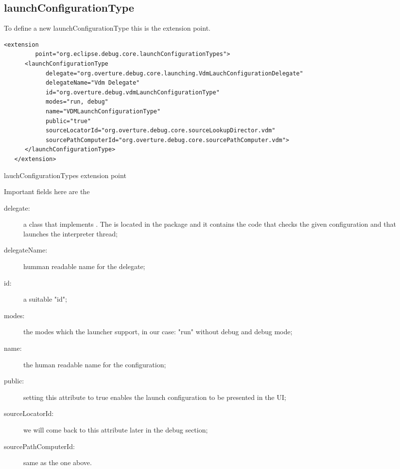 \subsection{launchConfigurationType}
To define a new launchConfigurationType this is the extension point.
\begin{program}
\scriptsize
\begin{verbatim}
<extension
         point="org.eclipse.debug.core.launchConfigurationTypes">
      <launchConfigurationType
            delegate="org.overture.debug.core.launching.VdmLauchConfigurationDelegate"
            delegateName="Vdm Delegate"
            id="org.overture.debug.vdmLaunchConfigurationType"
            modes="run, debug"
            name="VDMLaunchConfigurationType"
            public="true"
            sourceLocatorId="org.overture.debug.core.sourceLookupDirector.vdm"
            sourcePathComputerId="org.overture.debug.core.sourcePathComputer.vdm">
      </launchConfigurationType>
   </extension>
\end{verbatim}
\caption{lauchConfigurationTypes extension point}
\normalsize
\end{program}

Important fields here are the
\begin{description}


\item[delegate:] a class that implements . The  is located in the package  and it contains the code that checks the given configuration and that launches the interpreter thread;

\item[delegateName:] humman readable name for the delegate;

\item[id:] a suitable "id";

\item[modes:] the modes which the launcher support, in our case: "run" without debug and debug mode;

\item[name:] the human readable name for the configuration;

\item[public:] setting this attribute to true enables the launch configuration to be presented in the UI;

\item[sourceLocatorId:] we will come back to this attribute later in the debug section;

\item[sourcePathComputerId:] same as the one above.
\end{description}

